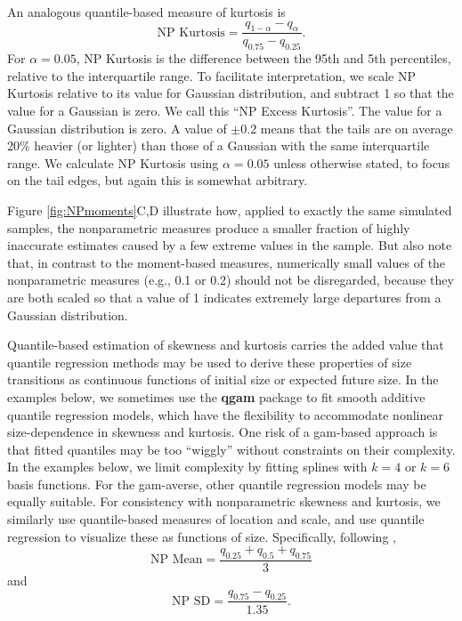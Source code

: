 \documentclass[12pt]{article}
\newcounter{box}
\newcommand{\be}{\begin{equation}}
\newcommand{\ee}{\end{equation}}
\begin{document}
An analogous quantile-based measure of kurtosis \citep{jones-etal-1994} is 
\be
\mbox{NP Kurtosis}  = \frac{q_{1-\alpha} - q_{\alpha}}{q_{0.75} - q_{0.25}}.
\label{eqn:NPkurt}
\ee
For $\alpha=0.05$, NP Kurtosis is the difference between the 95th and 5th percentiles, relative to the interquartile range. 
To facilitate interpretation, we scale NP Kurtosis relative to its value for Gaussian distribution, and subtract 1 so that the value for a Gaussian is zero. 
We call this ``NP Excess Kurtosis''. 
The value for a Gaussian distribution is zero. 
A value of $\pm 0.2$ means that the tails are on average 20\% heavier (or lighter) than those of a Gaussian with the same interquartile range. 
We calculate NP Kurtosis using $\alpha=0.05$ unless otherwise stated, to focus on the tail edges, but again this is somewhat arbitrary. 

Figure \ref{fig:NPmoments}C,D illustrate how, applied to exactly the same simulated samples, the nonparametric measures produce a smaller fraction of highly inaccurate estimates caused by a few extreme values in the sample. 
But also note that, in contrast to the moment-based measures, numerically small values of the nonparametric measures (e.g., 0.1 or 0.2) should not be disregarded, because they are both scaled so that a value of 1 indicates extremely large departures from a Gaussian distribution. 

Quantile-based estimation of skewness and kurtosis carries the added value that quantile regression methods may be used to derive these properties of size transitions as continuous functions of initial size or expected future size. 
In the examples below, we sometimes use the \textbf{qgam} package to fit smooth additive quantile regression models, which have the flexibility to accommodate nonlinear size-dependence in skewness and kurtosis. 
One risk of a gam-based approach is that fitted quantiles may be too ``wiggly'' without constraints on their complexity. In the examples below, we limit complexity by fitting splines with $k=4$ or $k=6$ basis functions. 
For the gam-averse, other quantile regression models may be equally suitable. 
For consistency with nonparametric skewness and kurtosis, we similarly use quantile-based measures of location and scale, and use quantile regression to visualize these as functions of size. 
Specifically, following \cite{wan2014estimating},
\be
\mbox{NP Mean}  = \frac{q_{0.25} + q_{0.5} + q_{0.75}}{3}
\label{eqn:NPmean}
\ee
and
\be
\mbox{NP SD}  = \frac{q_{0.75} - q_{0.25}}{1.35}.
\label{eqn:NPsd}
\ee
\end{document}
